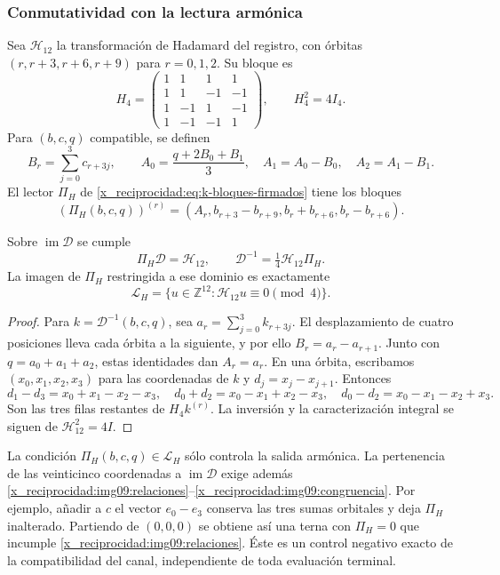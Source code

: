 \subsubsection{Conmutatividad con la lectura armónica}

Sea $\mathcal H_{12}$ la transformación de Hadamard del registro,
con órbitas $(r,r+3,r+6,r+9)$ para $r=0,1,2$. Su bloque es
\[
 H_4=\begin{pmatrix}
 1&1&1&1\\1&1&-1&-1\\1&-1&1&-1\\1&-1&-1&1
 \end{pmatrix},\qquad H_4^2=4I_4.
\]
Para $(b,c,q)$ compatible, se definen
\[
 B_r=\sum_{j=0}^3c_{r+3j},\qquad
 A_0=\frac{q+2B_0+B_1}{3},\quad A_1=A_0-B_0,
 \quad A_2=A_1-B_1.
\]
El lector $\Pi_H$ de \eqref{x_reciprocidad:eq:k-bloques-firmados} tiene los bloques
\[
 (\Pi_H(b,c,q))^{(r)}=
 (A_r,b_{r+3}-b_{r+9},b_r+b_{r+6},b_r-b_{r+6}).
\]

\begin{proposition}
\label{x_reciprocidad:img09:triangulo}
Sobre $\operatorname{im}\mathcal D$ se cumple
\[
 \Pi_H\mathcal D=\mathcal H_{12},\qquad
 \mathcal D^{-1}=\tfrac14\mathcal H_{12}\Pi_H.
\]
La imagen de $\Pi_H$ restringida a ese dominio es exactamente
\[
 \mathcal L_H=
 \{u\in\mathbb Z^{12}:\mathcal H_{12}u\equiv0\pmod4\}.
\]
\end{proposition}
\begin{proof}
Para $k=\mathcal D^{-1}(b,c,q)$, sea
$a_r=\sum_{j=0}^3k_{r+3j}$. El desplazamiento de cuatro posiciones
lleva cada órbita a la siguiente, y por ello $B_r=a_r-a_{r+1}$.
Junto con $q=a_0+a_1+a_2$, estas identidades dan $A_r=a_r$.
En una órbita, escribamos $(x_0,x_1,x_2,x_3)$ para las coordenadas
de $k$ y $d_j=x_j-x_{j+1}$. Entonces
\[
 d_1-d_3=x_0+x_1-x_2-x_3,\quad
 d_0+d_2=x_0-x_1+x_2-x_3,\quad
 d_0-d_2=x_0-x_1-x_2+x_3.
\]
Son las tres filas restantes de $H_4k^{(r)}$. La inversión y la
caracterización integral se siguen de $\mathcal H_{12}^2=4I$.
\end{proof}

La condición $\Pi_H(b,c,q)\in\mathcal L_H$ sólo controla la
salida armónica. La pertenencia de las veinticinco coordenadas a
$\operatorname{im}\mathcal D$ exige además
\eqref{x_reciprocidad:img09:relaciones}--\eqref{x_reciprocidad:img09:congruencia}.
Por ejemplo, añadir a $c$ el vector $e_0-e_3$ conserva las tres sumas
orbitales y deja $\Pi_H$ inalterado. Partiendo de $(0,0,0)$ se
obtiene así una terna con $\Pi_H=0$ que incumple
\eqref{x_reciprocidad:img09:relaciones}. Éste es un control negativo exacto de la
compatibilidad del canal, independiente de toda evaluación terminal.

